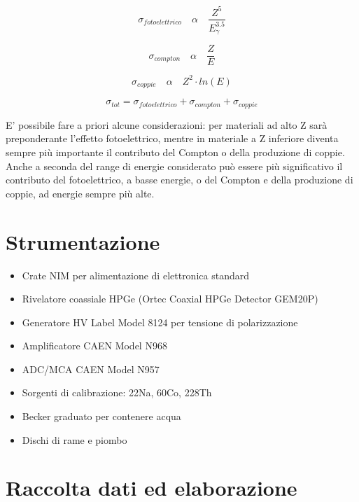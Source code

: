 \documentclass[a4paper,10pt]{article}
\begin{document}
\begin{equation}
	\sigma_{fotoelettrico}\quad  \alpha \quad  \frac{Z^5}{E_{\gamma}^{3.5}}
\end{equation}

\begin{equation}
	\sigma_{compton}\quad  \alpha \quad  \frac{Z}{E}
\end{equation}

\begin{equation}
	\sigma_{coppie}\quad  \alpha \quad  Z^2 \cdot ln(E)
\end{equation}

\begin{equation}
	\sigma_{tot} = \sigma_{fotoelettrico} + \sigma_{compton} + \sigma_{coppie}
\end{equation}

E' possibile fare a priori alcune considerazioni: per materiali ad alto Z sarà preponderante l'effetto fotoelettrico, mentre in materiale a Z inferiore diventa sempre più importante il contributo del Compton o della produzione di coppie. Anche a seconda del range di energie considerato può essere più significativo il contributo del fotoelettrico, a basse energie, o del Compton e della produzione di coppie, ad energie sempre più alte.


\section{Strumentazione}
\begin{itemize}
\item Crate NIM per alimentazione di elettronica standard
\item Rivelatore coassiale HPGe (Ortec Coaxial HPGe Detector GEM20P)
\item Generatore HV Label Model 8124 per tensione di polarizzazione
\item Amplificatore CAEN Model N968
\item ADC/MCA CAEN Model N957
\item Sorgenti di calibrazione: 22Na, 60Co, 228Th
\item Becker graduato per contenere acqua
\item Dischi di rame e piombo
\end{itemize}


\section{Raccolta dati ed elaborazione}
\end{document}
